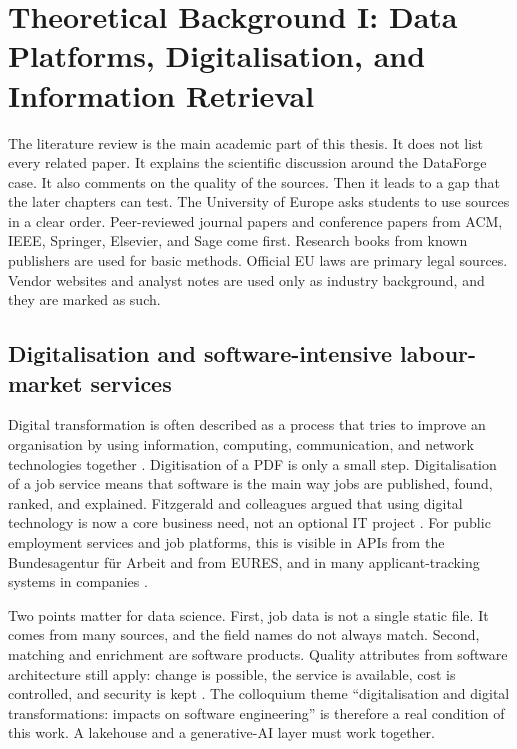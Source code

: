 \chapter{Theoretical Background I: Data Platforms, Digitalisation, and Information Retrieval}
\label{ch:theory-data}

The literature review is the main academic part of this thesis. It does not list every related paper. It explains the scientific discussion around the DataForge case. It also comments on the quality of the sources. Then it leads to a gap that the later chapters can test. The University of Europe asks students to use sources in a clear order. Peer-reviewed journal papers and conference papers from ACM, IEEE, Springer, Elsevier, and Sage come first. Research books from known publishers are used for basic methods. Official EU laws are primary legal sources. Vendor websites and analyst notes are used only as industry background, and they are marked as such.

\section{Digitalisation and software-intensive labour-market services}
\label{sec:digitalisation}

Digital transformation is often described as a process that tries to improve an organisation by using information, computing, communication, and network technologies together . Digitisation of a PDF is only a small step. Digitalisation of a job service means that software is the main way jobs are published, found, ranked, and explained. Fitzgerald and colleagues argued that using digital technology is now a core business need, not an optional IT project . For public employment services and job platforms, this is visible in APIs from the Bundesagentur f\"ur Arbeit and from EURES, and in many applicant-tracking systems in companies .

Two points matter for data science. First, job data is not a single static file. It comes from many sources, and the field names do not always match. Second, matching and enrichment are software products. Quality attributes from software architecture still apply: change is possible, the service is available, cost is controlled, and security is kept . The colloquium theme ``digitalisation and digital transformations: impacts on software engineering'' is therefore a real condition of this work. A lakehouse and a generative-AI layer must work together.

